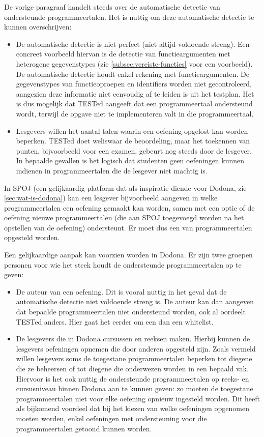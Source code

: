 De vorige paragraaf handelt steeds over de automatische detectie van ondersteunde programmeertalen.
Het is nuttig om deze automatische detectie te kunnen overschrijven:
\begin{itemize}
    \item De automatische detectie is niet perfect (niet altijd voldoende streng).
    Een concreet voorbeeld hiervan is de detectie van functieargumenten met heterogene gegevenstypes (zie \cref{subsec:vereiste-functies} voor een voorbeeld).
    De automatische detectie houdt enkel rekening met  functieargumenten.
    De gegevenstypes van functieoproepen en identifiers worden niet gecontroleerd, aangezien deze informatie niet eenvoudig af te leiden is uit het testplan.
    Het is dus mogelijk dat TESTed aangeeft dat een programmeertaal ondersteund wordt, terwijl de opgave niet te implementeren valt in die programmeertaal.
    \item Lesgevers willen het aantal talen waarin een oefening opgelost kan worden beperken.
    TESTed doet weliswaar de beoordeling, maar het toekennen van punten, bijvoorbeeld voor een examen, gebeurt nog steeds door de lesgever.
    In bepaalde gevallen is het logisch dat studenten geen oefeningen kunnen indienen in programmeertalen die de lesgever niet machtig is.
\end{itemize}

In SPOJ (een gelijkaardig platform dat als inspiratie diende voor Dodona, zie \cref{sec:wat-is-dodona}) kan een lesgever bijvoorbeeld aangeven in welke programmeertalen een oefening gemaakt kan worden, samen met een optie of de oefening nieuwe programmeertalen (die aan SPOJ toegevoegd worden na het opstellen van de oefening) ondersteunt.
Er moet dus een  van programmeertalen opgesteld worden.

Een gelijkaardige aanpak kan voorzien worden in Dodona.
Er zijn twee groepen personen voor wie het steek houdt de ondersteunde programmeertalen op te geven:

\begin{itemize}
    \item De auteur van een oefening.
    Dit is vooral nuttig in het geval dat de automatische detectie niet voldoende streng is.
    De auteur kan dan aangeven dat bepaalde programmeertalen niet ondersteund worden, ook al oordeelt TESTed anders.
    Hier gaat het eerder om een  dan een whitelist.
    \item De lesgevers die in Dodona cursussen en reeksen maken.
    Hierbij kunnen de lesgevers oefeningen opnemen die door anderen opgesteld zijn.
    Zoals vermeld willen lesgevers soms de toegestane programmeertalen beperken tot diegene die ze beheersen of tot diegene die onderwezen worden in een bepaald vak.
    Hiervoor is het ook nuttig de ondersteunde programmeertalen op reeks- en cursusniveau binnen Dodona aan te kunnen geven: zo moeten de toegestane programmeertalen niet voor elke oefening opnieuw ingesteld worden.
    Dit heeft als bijkomend voordeel dat bij het kiezen van welke oefeningen opgenomen moeten worden, enkel oefeningen met ondersteuning voor die programmeertalen getoond kunnen worden.
\end{itemize}

